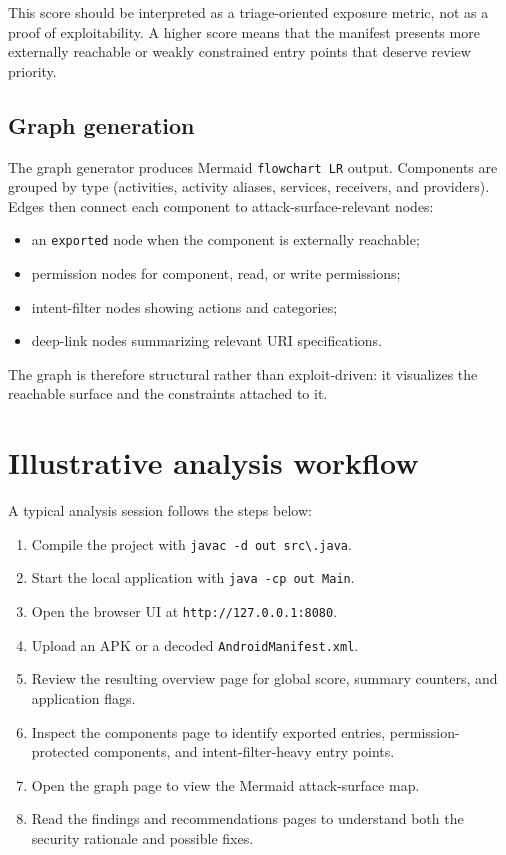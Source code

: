 \documentclass[preprint,12pt,a4paper]{elsarticle}
\begin{document}
This score should be interpreted as a triage-oriented exposure metric, not as a proof of exploitability. A higher score means that the manifest presents more externally reachable or weakly constrained entry points that deserve review priority.

\subsection{Graph generation}

The graph generator produces Mermaid \texttt{flowchart LR} output. Components are grouped by type (activities, activity aliases, services, receivers, and providers). Edges then connect each component to attack-surface-relevant nodes:

\begin{itemize}[leftmargin=*]
\item an \texttt{exported} node when the component is externally reachable;
\item permission nodes for component, read, or write permissions;
\item intent-filter nodes showing actions and categories;
\item deep-link nodes summarizing relevant URI specifications.
\end{itemize}

The graph is therefore structural rather than exploit-driven: it visualizes the reachable surface and the constraints attached to it.

\section{Illustrative analysis workflow}

A typical analysis session follows the steps below:

\begin{enumerate}[leftmargin=*,label=\textbf{Step \arabic*.}]
\item Compile the project with \texttt{javac -d out src\textbackslash*.java}.
\item Start the local application with \texttt{java -cp out Main}.
\item Open the browser UI at \texttt{http://127.0.0.1:8080}.
\item Upload an APK or a decoded \texttt{AndroidManifest.xml}.
\item Review the resulting overview page for global score, summary counters, and application flags.
\item Inspect the components page to identify exported entries, permission-protected components, and intent-filter-heavy entry points.
\item Open the graph page to view the Mermaid attack-surface map.
\item Read the findings and recommendations pages to understand both the security rationale and possible fixes.
\end{enumerate}
\end{document}

